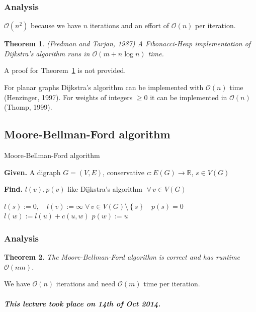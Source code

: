 \documentclass{article}
\newtheorem{theorem}{Theorem}
\newcommand{\set}[1]{\left\{#1\right\}}
\newcommand{\given}[1]{\textbf{Given.} #1\par}
\newcommand{\find}[1]{\textbf{Find.} #1\par}
\newcommand{\dateref}[1]{\paragraph{\textit{This lecture took place on #1.}}}
\newcommand{\fall}{\;\forall\,}
\newcommand{\noproof}[1]{A proof for Theorem~\ref{#1} is not provided.}
\begin{document}
\subsubsection{Analysis}
%
$\mathcal{O}(n^2)$ because we have $n$ iterations and an effort of $\mathcal{O}(n)$ per iteration.

\begin{theorem}\label{satz-3.3}
  (Fredman and Tarjan, 1987)
  A Fibonacci-Heap implementation of Dijkstra's algorithm runs in $\mathcal{O}(m + n\log{n})$ time.
\end{theorem}

\noproof{satz-3.3}

For planar graphs Dijkstra's algorithm can be implemented with $\mathcal{O}(n)$ time (Henzinger, 1997). For weights of integers $\geq 0$ it can be implemented in $\mathcal{O}(n)$ (Thomp, 1999).

\subsection{Moore-Bellman-Ford algorithm}
%
\begin{algorithm}
  \caption{Moore-Bellman-Ford algorithm}
  \label{mbf-algo}
  \given{A digraph $G=(V, E)$, conservative $c: E(G) \rightarrow \mathbb{R}$, $s \in V(G)$}
  \find{$l(v), p(v)$ like Dijkstra's algorithm $\fall v \in V(G)$}
\begin{algorithmic}[1]
  \State $l(s) := 0, \quad l(v) := \infty \fall v \in V(G) \setminus \set{s} \quad p(s) = 0$
        \State $l(w) := l(u) + c(u, w)$
        \State $p(w) := u$
      \EndIf
    \EndFor
  \EndFor
\end{algorithmic}
\end{algorithm}

\subsubsection{Analysis}

\begin{theorem}\label{satz-3.4}
  The Moore-Bellman-Ford algorithm is correct and has runtime $\mathcal{O}(nm)$.
\end{theorem}

We have $\mathcal{O}(n)$ iterations and need $\mathcal{O}(m)$ time per iteration.

\dateref{14th of Oct 2014}
\end{document}
